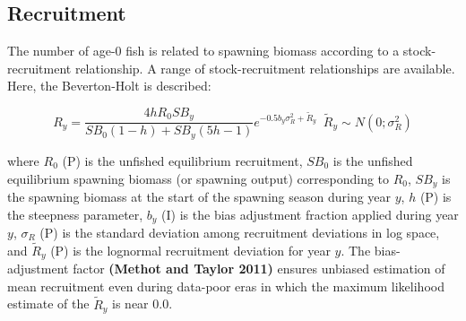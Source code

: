 \documentclass[11pt,
  english,
  letterpaper,
]{article}
\begin{document}

\hypertarget{recruitment}{%
\subsection{Recruitment}\label{recruitment}}

\leavevmode\tagmcend\tagstructend


The number of age-0 fish is related to spawning biomass according to a stock-recruitment relationship. A range of stock-recruitment relationships are available. Here, the Beverton-Holt is described:

\leavevmode\tagmcend\tagstructend\par


\begin{equation}
\label{eqn2}
R_y = \frac{4hR_0SB_y}{SB_0(1-h)+SB_y(5h-1)}e^{-0.5b_y\sigma_R^2+\tilde{R}_y} \;\ \tilde{R}_y \sim N(0; \sigma_R^2)
\end{equation}

\leavevmode\tagmcend\tagstructend\par


where {\(R_0\)\leavevmode\tagmcend\tagstructend} (P) is the unfished equilibrium recruitment, {\(SB_0\)\leavevmode\tagmcend\tagstructend} is the unfished equilibrium spawning biomass (or spawning output) corresponding to {\(R_0\)\leavevmode\tagmcend\tagstructend}, {\(SB_y\)\leavevmode\tagmcend\tagstructend} is the spawning biomass at the start of the spawning season during year {\(y\)\leavevmode\tagmcend\tagstructend}, {\(h\)\leavevmode\tagmcend\tagstructend} (P) is the steepness parameter, {\(b_y\)\leavevmode\tagmcend\tagstructend} (I) is the bias adjustment fraction applied during year {\(y\)\leavevmode\tagmcend\tagstructend}, {\(\sigma_R\)\leavevmode\tagmcend\tagstructend} (P) is the standard deviation among recruitment deviations in log space, and {\(\tilde{R}_y\)\leavevmode\tagmcend\tagstructend} (P) is the lognormal recruitment deviation for year {\(y\)\leavevmode\tagmcend\tagstructend}. The bias-adjustment factor \textbf{(Methot and Taylor 2011)} ensures unbiased estimation of mean recruitment even during data-poor eras in which the maximum likelihood estimate of the {\(\tilde{R}_y\)\leavevmode\tagmcend\tagstructend} is near 0.0.
\end{document}
